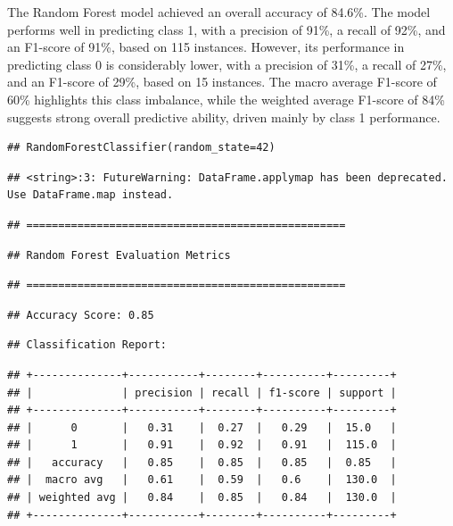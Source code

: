 \documentclass[preprint, 3p,
authoryear]{elsarticle} %
\begin{document}
\hfill\break
The Random Forest model achieved an overall accuracy of 84.6\%. The
model performs well in predicting class 1, with a precision of 91\%, a
recall of 92\%, and an F1-score of 91\%, based on 115 instances.
However, its performance in predicting class 0 is considerably lower,
with a precision of 31\%, a recall of 27\%, and an F1-score of 29\%,
based on 15 instances. The macro average F1-score of 60\% highlights
this class imbalance, while the weighted average F1-score of 84\%
suggests strong overall predictive ability, driven mainly by class 1
performance.

\begin{verbatim}
## RandomForestClassifier(random_state=42)
\end{verbatim}

\begin{verbatim}
## <string>:3: FutureWarning: DataFrame.applymap has been deprecated. Use DataFrame.map instead.
\end{verbatim}

\begin{verbatim}
## ==================================================
\end{verbatim}

\begin{verbatim}
## Random Forest Evaluation Metrics
\end{verbatim}

\begin{verbatim}
## ==================================================
\end{verbatim}

\begin{verbatim}
## Accuracy Score: 0.85
\end{verbatim}

\begin{verbatim}
## Classification Report:
\end{verbatim}

\begin{verbatim}
## +--------------+-----------+--------+----------+---------+
## |              | precision | recall | f1-score | support |
## +--------------+-----------+--------+----------+---------+
## |      0       |   0.31    |  0.27  |   0.29   |  15.0   |
## |      1       |   0.91    |  0.92  |   0.91   |  115.0  |
## |   accuracy   |   0.85    |  0.85  |   0.85   |  0.85   |
## |  macro avg   |   0.61    |  0.59  |   0.6    |  130.0  |
## | weighted avg |   0.84    |  0.85  |   0.84   |  130.0  |
## +--------------+-----------+--------+----------+---------+
\end{verbatim}
\end{document}
